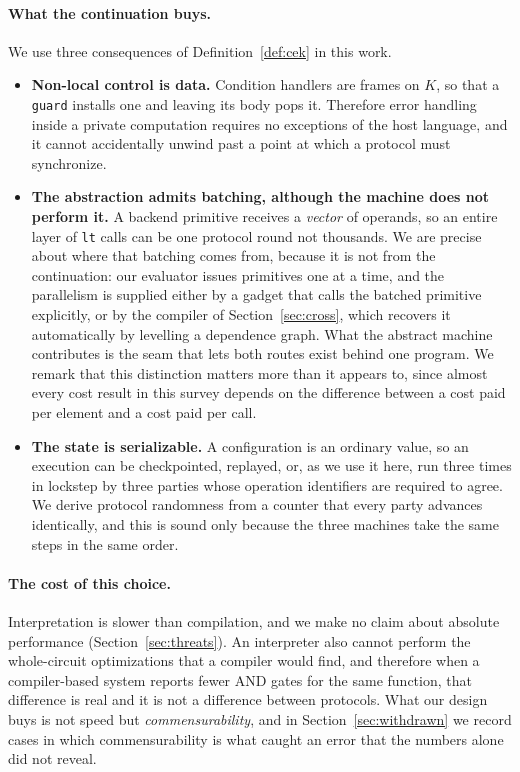 \documentclass[11pt]{article}
\newcommand{\bt}[1]{\texttt{#1}}
\begin{document}
\paragraph{What the continuation buys.} We use three consequences of
Definition~\ref{def:cek} in this work.

\begin{itemize}
  \item \textbf{Non-local control is data.} Condition handlers are frames on $K$, so that a
    \bt{guard} installs one and leaving its body pops it. Therefore error handling inside a
    private computation requires no exceptions of the host language, and it cannot
    accidentally unwind past a point at which a protocol must synchronize.
  \item \textbf{The abstraction admits batching, although the machine does not perform it.} A
    backend primitive receives a \emph{vector} of operands, so an entire layer of \bt{lt} calls
    can be one protocol round not thousands. We are precise about where that batching
    comes from, because it is not from the continuation: our evaluator issues primitives one at
    a time, and the parallelism is supplied either by a gadget that calls the batched primitive
    explicitly, or by the compiler of Section~\ref{sec:cross}, which recovers it automatically
    by levelling a dependence graph. What the abstract machine contributes is the seam that lets
    both routes exist behind one program. We remark that this distinction matters more than it
    appears to, since almost every cost result in this survey depends on the difference between
    a cost paid per element and a cost paid per call.
  \item \textbf{The state is serializable.} A configuration is an ordinary value, so an
    execution can be checkpointed, replayed, or, as we use it here, run three times in
    lockstep by three parties whose operation identifiers are required to agree. We derive
    protocol randomness from a counter that every party advances identically, and this is
    sound only because the three machines take the same steps in the same order.
\end{itemize}

\paragraph{The cost of this choice.} Interpretation is slower than compilation, and we make
no claim about absolute performance (Section~\ref{sec:threats}). An interpreter also cannot
perform the whole-circuit optimizations that a compiler would find, and therefore when a
compiler-based system reports fewer AND gates for the same function, that difference is real
and it is not a difference between protocols. What our design buys is not speed but
\emph{commensurability}, and in Section~\ref{sec:withdrawn} we record cases in which
commensurability is what caught an error that the numbers alone did not reveal.
\end{document}
